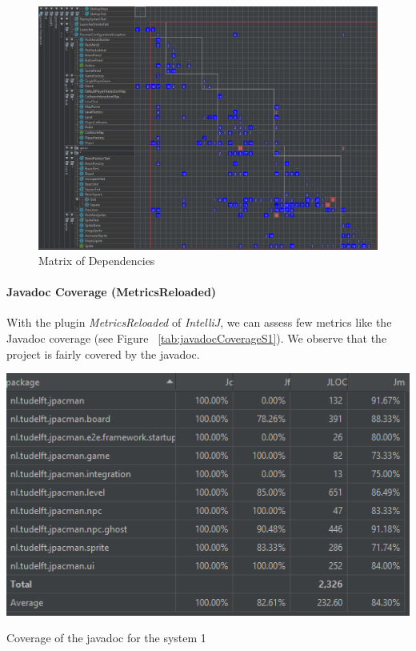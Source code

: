 \documentclass[]{article}
\begin{document}
\begin{figure}
    \centering
    \includegraphics[width=\linewidth]{imgs/matrix dependencies.PNG}
    \caption{Matrix of Dependencies}
    \label{fig:DependenciesMatrixS1}
\end{figure}

\paragraph{Javadoc Coverage (MetricsReloaded)}

With the plugin \textit{MetricsReloaded} of \textit{IntelliJ}, we can assess few metrics like the Javadoc coverage (see Figure ~\ref{tab:javadocCoverageS1}). We observe that the project is fairly covered by the javadoc.

\begin{table}
    \centering
    \includegraphics[width=\linewidth]{imgs/JavaDocCoverageS1.PNG}
    \caption{Coverage of the javadoc for the system 1}
    \label{tab:javadocCoverageS1}
\end{table}
\end{document}
